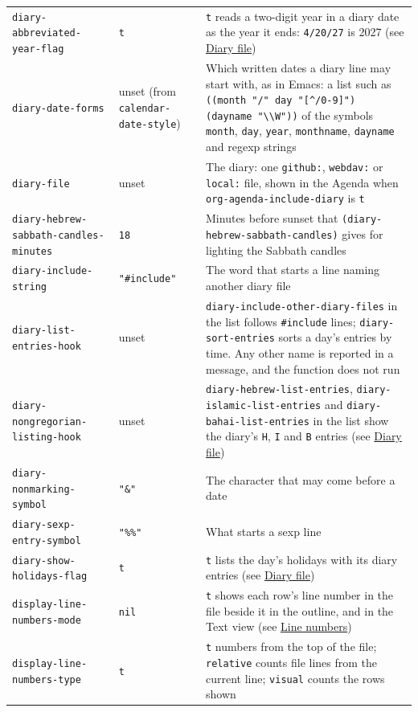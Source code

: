 \documentclass[11pt]{article}
\begin{document}
\begin{center}
\begin{tabular}{lll}
\texttt{diary-abbreviated-year-flag} & \texttt{t} & \texttt{t} reads a two-digit year in a diary date as the year it ends: \texttt{4/20/27} is 2027 (see \hyperref[sec:orgc7359b6]{Diary file})\\[0pt]
\texttt{diary-date-forms} & unset (from \texttt{calendar-date-style}) & Which written dates a diary line may start with, as in Emacs: a list such as \texttt{((month "/" day "[\textasciicircum{}/0-9]") (dayname "\textbackslash{}\textbackslash{}W"))} of the symbols \texttt{month}, \texttt{day}, \texttt{year}, \texttt{monthname}, \texttt{dayname} and regexp strings\\[0pt]
\texttt{diary-file} & unset & The diary: one \texttt{github:}, \texttt{webdav:} or \texttt{local:} file, shown in the Agenda when \texttt{org-agenda-include-diary} is \texttt{t}\\[0pt]
\texttt{diary-hebrew-sabbath-candles-minutes} & \texttt{18} & Minutes before sunset that \texttt{(diary-hebrew-sabbath-candles)} gives for lighting the Sabbath candles\\[0pt]
\texttt{diary-include-string} & \texttt{"\#include"} & The word that starts a line naming another diary file\\[0pt]
\texttt{diary-list-entries-hook} & unset & \texttt{diary-include-other-diary-files} in the list follows \texttt{\#include} lines; \texttt{diary-sort-entries} sorts a day's entries by time. Any other name is reported in a message, and the function does not run\\[0pt]
\texttt{diary-nongregorian-listing-hook} & unset & \texttt{diary-hebrew-list-entries}, \texttt{diary-islamic-list-entries} and \texttt{diary-bahai-list-entries} in the list show the diary's \texttt{H}, \texttt{I} and \texttt{B} entries (see \hyperref[sec:orgc7359b6]{Diary file})\\[0pt]
\texttt{diary-nonmarking-symbol} & \texttt{"\&"} & The character that may come before a date\\[0pt]
\texttt{diary-sexp-entry-symbol} & \texttt{"\%\%"} & What starts a sexp line\\[0pt]
\texttt{diary-show-holidays-flag} & \texttt{t} & \texttt{t} lists the day's holidays with its diary entries (see \hyperref[sec:orgc7359b6]{Diary file})\\[0pt]
\texttt{display-line-numbers-mode} & \texttt{nil} & \texttt{t} shows each row's line number in the file beside it in the outline, and in the Text view (see \hyperref[sec:org31dd5c0]{Line numbers})\\[0pt]
\texttt{display-line-numbers-type} & \texttt{t} & \texttt{t} numbers from the top of the file; \texttt{relative} counts file lines from the current line; \texttt{visual} counts the rows shown\\[0pt]

\end{tabular}
\end{center}
\end{document}
